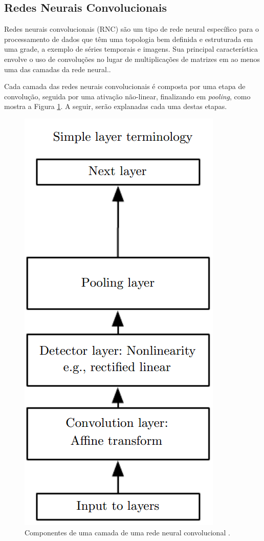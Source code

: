 \subsection{Redes Neurais Convolucionais}
Redes neurais convolucionais (RNC) são um tipo de rede neural específico para o processamento de dados que têm uma topologia bem definida e estruturada em uma grade, a exemplo de séries temporais e imagens. Sua principal característica envolve o uso de convoluções no lugar de multiplicações de matrizes em ao menos uma das camadas da rede neural.\cite{goodfellow2016deep}.

Cada camada das redes neurais convolucionais é composta por uma etapa de convolução, seguida por uma ativação não-linear, finalizando em \emph{pooling}, como mostra a Figura \ref{fig:cnn_camada}. A seguir, serão explanadas cada uma destas etapas.

\begin{figure}
	\includegraphics[height=0.5\textheight]{img/cnn_camada.png}
	\caption{Componentes de uma camada de uma rede neural convolucional \cite{goodfellow2016deep}. }
	\label{fig:cnn_camada}
\end{figure}

